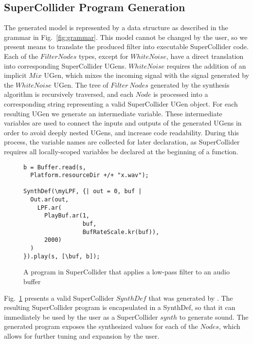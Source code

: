 \subsection{SuperCollider Program Generation}

The generated model is represented by a data structure as described in the grammar in Fig.~\ref{fig:grammar}. 
This model cannot be changed by the user, so we present means to translate the produced filter into executable SuperCollider code.
Each of the $Filter Nodes$ types, except for $WhiteNoise$, have a direct translation into corresponding SuperCollider UGens. 
$WhiteNoise$ requires the addition of an implicit $Mix$ UGen, which mixes the incoming signal with the signal generated by the $WhiteNoise$ UGen.
The tree of $Filter\ Nodes$ generated by the synthesis algorithm is recursively traversed, and each $Node$ is processed into a corresponding string representing a valid SuperCollider UGen object.
For each resulting UGen we generate an intermediate variable.
These intermediate variables are used to connect the inputs and outputs of the generated UGens in order to avoid deeply nested UGens, and increase code readability.
During this process, the variable names are collected for later declaration, as SuperCollider requires all locally-scoped variables be declared at the beginning of a function.

\begin{figure}
\begin{lstlisting}
b = Buffer.read(s, 
  Platform.resourceDir +/+ "x.wav");

SynthDef(\myLPF, {| out = 0, buf |
  Out.ar(out,
    LPF.ar(
      PlayBuf.ar(1, 
                 buf, 
                 BufRateScale.kr(buf)),
      2000)
  )
}).play(s, [\buf, b]);
\end{lstlisting}
\caption{A program in SuperCollider that applies a low-pass filter to an audio buffer}
\label{fig:sc_code2}
\end{figure}

Fig.~\ref{fig:sc_code2}  presents a valid SuperCollider $SynthDef$ that was generated by \ourTool.
The resulting SuperCollider program is encapsulated in a SynthDef, so that it can immediately be used by the user as a SuperCollider $synth$ to generate sound.
The generated program exposes the synthesized values for each of the $Nodes$, which allows for further tuning and expansion by the user.


